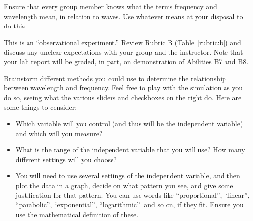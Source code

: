 \begin{steps}
	
	\item Ensure that every group member knows what the terms frequency and wavelength mean, in relation to waves. Use whatever means at your disposal to do this.
	
	\item This is an ``observational experiment.'' Review Rubric B (Table~\ref{rubric:b}) and discuss any unclear expectations with your group and the instructor. Note that your lab report will be graded, in part, on demonstration of Abilities B7 and B8.
	
	
	\item Brainstorm different methods you could use to determine the relationship between wavelength and frequency. Feel free to play with the simulation as you do so, seeing what the various sliders and checkboxes on the right do. Here are some things to consider:
	\begin{itemize}
		\item Which variable will you control (and thus will be the independent variable) and which will you measure?
		
		\item What is the range of the independent variable that you will use? How many different settings will you choose?
		
		\item You will need to use several settings of the independent variable, and then plot the data in a graph, decide on what pattern you see, and give some justification for that pattern. You can use words like ``proportional'', ``linear'', ``parabolic'', ``exponential'', ``logarithmic'', and so on, if they fit. Ensure you use the mathematical definition of these.
		

\end{itemize}
\end{steps}
